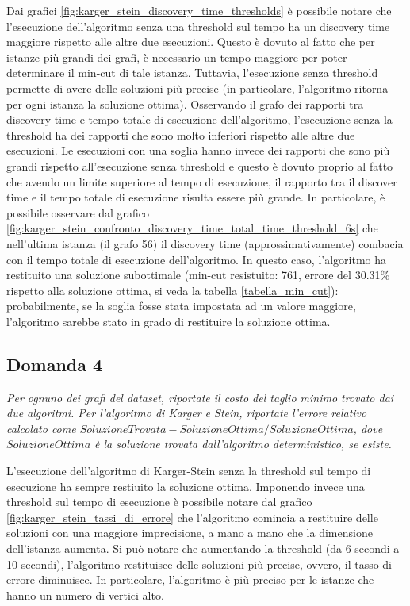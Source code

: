 Dai grafici \ref{fig:karger_stein_discovery_time_thresholds} è possibile notare che 
l'esecuzione dell'algoritmo senza una threshold sul tempo ha un discovery 
time maggiore rispetto alle altre due esecuzioni. Questo è dovuto al fatto che per 
istanze più grandi dei grafi, è necessario un tempo maggiore per poter determinare 
il min-cut di tale istanza. Tuttavia, l'esecuzione senza threshold permette di avere 
delle soluzioni più precise (in particolare, l'algoritmo ritorna per ogni istanza la 
soluzione ottima). Osservando il grafo dei rapporti tra discovery time e tempo totale 
di esecuzione dell'algoritmo, l'esecuzione senza la threshold ha dei rapporti che sono 
molto inferiori rispetto alle altre due esecuzioni. Le esecuzioni con una soglia 
hanno invece dei rapporti che sono più grandi rispetto all'esecuzione senza threshold 
e questo è dovuto proprio al fatto che avendo un limite superiore al tempo di 
esecuzione, il rapporto tra il discover time e il tempo totale di esecuzione risulta  
essere più grande. In particolare, è possibile osservare dal grafico 
\ref{fig:karger_stein_confronto_discovery_time_total_time_threshold_6s} che 
nell'ultima istanza (il grafo 56) il discovery time (approssimativamente) combacia 
con il tempo totale di esecuzione dell'algoritmo. In questo caso, l'algoritmo ha 
restituito una soluzione subottimale (min-cut resistuito: 761, errore del 30.31\% 
rispetto alla soluzione ottima, si veda la tabella \ref{tabella_min_cut}): 
probabilmente, se la soglia fosse stata impostata ad un valore maggiore, l'algoritmo 
sarebbe stato in grado di restituire la soluzione ottima.

\subsection{Domanda 4}
\textit{Per ognuno dei grafi del dataset, riportate il costo del taglio minimo trovato dai due algoritmi. Per l'algoritmo di Karger e Stein, riportate l'errore relativo calcolato come $SoluzioneTrovata-SoluzioneOttima/SoluzioneOttima$, dove $SoluzioneOttima$ è la soluzione trovata dall'algoritmo deterministico, se esiste.}

L'esecuzione dell'algoritmo di Karger-Stein senza la threshold sul 
tempo di esecuzione ha sempre restiuito la soluzione ottima. 
Imponendo invece una threshold sul tempo di esecuzione è possibile 
notare dal grafico \ref{fig:karger_stein_tassi_di_errore} che 
l'algoritmo comincia a restituire delle soluzioni con una maggiore 
imprecisione, a mano a mano che la dimensione dell'istanza aumenta. 
Si può notare che aumentando la threshold (da 6 secondi a 10 secondi), 
l'algoritmo restituisce delle soluzioni più precise, ovvero, il tasso di 
errore diminuisce. In particolare, l'algoritmo è più preciso per le 
istanze che hanno un numero di vertici alto.

